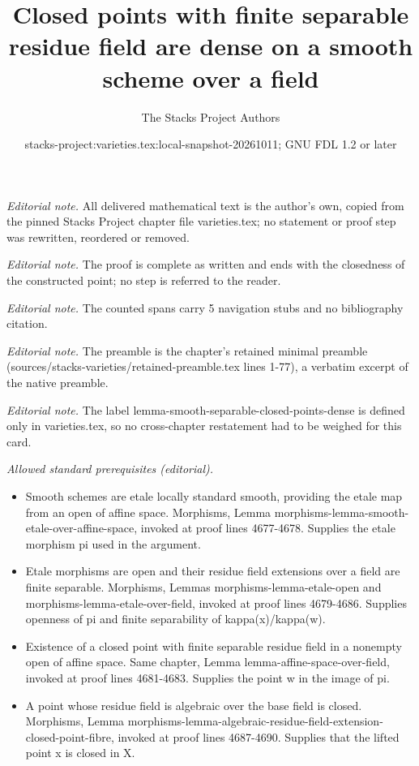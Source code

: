 \documentclass[10pt,a4paper]{amsart}
\title{Closed points with finite separable residue field are dense on a smooth scheme over a field}
\author{The Stacks Project Authors}
\date{stacks-project:varieties.tex:local-snapshot-20261011; GNU FDL 1.2 or later}
\theoremstyle{plain}
\theoremstyle{definition}
\theoremstyle{remark}
\numberwithin{equation}{subsection}
\begin{document}
\maketitle
\noindent\textit{Editorial note.} All delivered mathematical text is the author's own, copied from the pinned Stacks Project chapter file varieties.tex; no statement or proof step was rewritten, reordered or removed.\par\medskip
\noindent\textit{Editorial note.} The proof is complete as written and ends with the closedness of the constructed point; no step is referred to the reader.\par\medskip
\noindent\textit{Editorial note.} The counted spans carry 5 navigation stubs and no bibliography citation.\par\medskip
\noindent\textit{Editorial note.} The preamble is the chapter's retained minimal preamble (sources/stacks-varieties/retained-preamble.tex lines 1-77), a verbatim excerpt of the native preamble.\par\medskip
\noindent\textit{Editorial note.} The label lemma-smooth-separable-closed-points-dense is defined only in varieties.tex, so no cross-chapter restatement had to be weighed for this card.\par\medskip
\noindent\textit{Allowed standard prerequisites (editorial).}\begin{itemize}
\item Smooth schemes are etale locally standard smooth, providing the etale map from an open of affine space. Morphisms, Lemma morphisms-lemma-smooth-etale-over-affine-space, invoked at proof lines 4677-4678. Supplies the etale morphism pi used in the argument.
\item Etale morphisms are open and their residue field extensions over a field are finite separable. Morphisms, Lemmas morphisms-lemma-etale-open and morphisms-lemma-etale-over-field, invoked at proof lines 4679-4686. Supplies openness of pi and finite separability of kappa(x)/kappa(w).
\item Existence of a closed point with finite separable residue field in a nonempty open of affine space. Same chapter, Lemma lemma-affine-space-over-field, invoked at proof lines 4681-4683. Supplies the point w in the image of pi.
\item A point whose residue field is algebraic over the base field is closed. Morphisms, Lemma morphisms-lemma-algebraic-residue-field-extension-closed-point-fibre, invoked at proof lines 4687-4690. Supplies that the lifted point x is closed in X.
\end{itemize}\medskip
\end{document}
